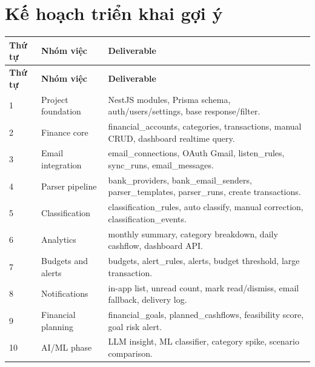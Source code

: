 \documentclass[11pt,a4paper]{article}
\renewcommand{\thead}[1]{\textbf{\color{PrimaryDark}#1}}
\newenvironment{tableblock}{\Needspace{8\baselineskip}\vspace{0.25em}}{\vspace{0.75em}}
\begin{document}
\section{Kế hoạch triển khai gợi ý}
\begin{tableblock}
\scriptsize
\begin{longtable}{L{1.7cm}L{4.2cm}L{9.4cm}}
\thead{Thứ tự} & \thead{Nhóm việc} & \thead{Deliverable} \\
\endfirsthead
{}\thead{Thứ tự} & \thead{Nhóm việc} & \thead{Deliverable} \\
 & Project foundation & NestJS modules, Prisma schema, auth/users/settings, base response/filter. \\
2 & Finance core & financial\_accounts, categories, transactions, manual CRUD, dashboard realtime query. \\
3 & Email integration & email\_connections, OAuth Gmail, listen\_rules, sync\_runs, email\_messages. \\
4 & Parser pipeline & bank\_providers, bank\_email\_senders, parser\_templates, parser\_runs, create transactions. \\
5 & Classification & classification\_rules, auto classify, manual correction, classification\_events. \\
6 & Analytics & monthly summary, category breakdown, daily cashflow, dashboard API. \\
7 & Budgets and alerts & budgets, alert\_rules, alerts, budget threshold, large transaction. \\
8 & Notifications & in-app list, unread count, mark read/dismiss, email fallback, delivery log. \\
9 & Financial planning & financial\_goals, planned\_cashflows, feasibility score, goal risk alert. \\
10 & AI/ML phase & LLM insight, ML classifier, category spike, scenario comparison. \\
\end{longtable}
\end{tableblock}
\end{document}
